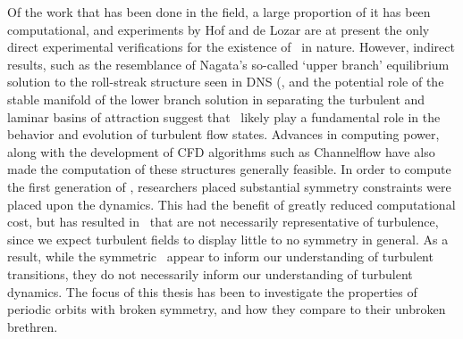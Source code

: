 {Of the work that has been done in the field, a large proportion of it has been computational, and experiments by Hof and de Lozar  are at present the only direct experimental verifications for the existence of \ecs~in nature. However, indirect results, such as the resemblance of Nagata's so-called `upper branch' equilibrium solution to the roll-streak structure seen in DNS (, and the potential role of the stable manifold of the lower branch solution in separating the turbulent and laminar basins of attraction suggest that \ecs\ likely play a fundamental role in the behavior and evolution of turbulent flow states. Advances in computing power, along with the development of CFD algorithms such as Channelflow have also made the computation of these structures generally feasible. In order to compute the first generation of \ecs, researchers placed substantial symmetry constraints were placed upon the dynamics. This had the benefit of greatly reduced computational cost, but has resulted in \ecs\ that are not necessarily representative of turbulence, since we expect turbulent fields to display little to no symmetry in general. As a result, while the symmetric \ecs\ 	appear to inform our understanding of turbulent transitions, they do not necessarily inform our understanding of turbulent dynamics. The focus of this thesis has been to investigate the properties of periodic orbits with broken symmetry, and how they compare to their unbroken brethren. 
 
}

